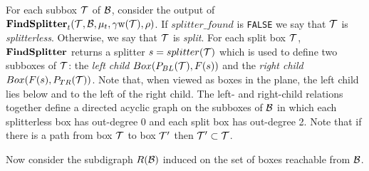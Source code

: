 \documentclass{acmsmall}
\newcommand{\cB}{{\cal B}}
\newcommand{\cT}{{\cal T}}
\newcommand{\bx}{Box}
\newcommand{\width}{{\bf {\rm  w}}}
\newcommand{\findsplitter}{{\rm {\bf FindSplitter}}}
\newcommand{\splitterfound}{splitter\_found}
\begin{document}


For each subbox $\cT$ of $\cB$, consider the output of $\findsplitter_t(\cT,\cB,\mu_t,\gamma \width(\cT),\rho)$.
If $\splitterfound$ is {\tt FALSE} we say that $\cT$ is {\em splitterless}. Otherwise, we say that $\cT$ is {\em split}.
For each split box $\cT$, $\findsplitter$ returns a splitter $s=splitter(\cT)$ which is used to define two
subboxes of $\cT$: the {\em left child} $\bx(P_{BL}(\cT),F(s))$ and the {\em right child} $\bx(F(s),P_{TR}(\cT))$.
Note that, when viewed as boxes in the plane, the left child lies below and to  the left of the right child.  The
left- and right-child relations together
define a directed acyclic graph on the subboxes of $\cB$ in which each splitterless box has out-degree 0
and each split box has out-degree 2.  Note that if there is a path from box $\cT$ to box $\cT'$ then
$\cT' \subset \cT$.

Now consider the subdigraph $R(\cB)$ induced on the set of boxes reachable from $\cB$.  
\end{document}
